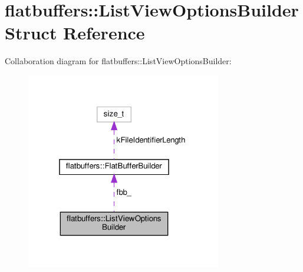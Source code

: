 \hypertarget{structflatbuffers_1_1ListViewOptionsBuilder}{}\section{flatbuffers\+:\+:List\+View\+Options\+Builder Struct Reference}
\label{structflatbuffers_1_1ListViewOptionsBuilder}


Collaboration diagram for flatbuffers\+:\+:List\+View\+Options\+Builder\+:
\nopagebreak
\begin{figure}[H]
\begin{center}
\leavevmode
\includegraphics[width=241pt]{structflatbuffers_1_1ListViewOptionsBuilder__coll__graph}
\end{center}
\end{figure}
